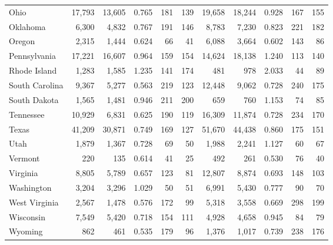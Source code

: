 \documentclass[
]{article}
\begin{document}
\begin{table}
\begin{tabular}[t]{lrrrrrrrrrr}
\addlinespace
Ohio & 17,793 & 13,605 & 0.765 & 181 & 139 & 19,658 & 18,244 & 0.928 & 167 & 155\\
Oklahoma & 6,300 & 4,832 & 0.767 & 191 & 146 & 8,783 & 7,230 & 0.823 & 221 & 182\\
Oregon & 2,315 & 1,444 & 0.624 & 66 & 41 & 6,088 & 3,664 & 0.602 & 143 & 86\\
Pennsylvania & 17,221 & 16,607 & 0.964 & 159 & 154 & 14,624 & 18,138 & 1.240 & 113 & 140\\
Rhode Island & 1,283 & 1,585 & 1.235 & 141 & 174 & 481 & 978 & 2.033 & 44 & 89\\
\addlinespace
South Carolina & 9,367 & 5,277 & 0.563 & 219 & 123 & 12,448 & 9,062 & 0.728 & 240 & 175\\
South Dakota & 1,565 & 1,481 & 0.946 & 211 & 200 & 659 & 760 & 1.153 & 74 & 85\\
Tennessee & 10,929 & 6,831 & 0.625 & 190 & 119 & 16,309 & 11,874 & 0.728 & 234 & 170\\
Texas & 41,209 & 30,871 & 0.749 & 169 & 127 & 51,670 & 44,438 & 0.860 & 175 & 151\\
Utah & 1,879 & 1,367 & 0.728 & 69 & 50 & 1,988 & 2,241 & 1.127 & 60 & 67\\
\addlinespace
Vermont & 220 & 135 & 0.614 & 41 & 25 & 492 & 261 & 0.530 & 76 & 40\\
Virginia & 8,805 & 5,789 & 0.657 & 123 & 81 & 12,807 & 8,874 & 0.693 & 148 & 103\\
Washington & 3,204 & 3,296 & 1.029 & 50 & 51 & 6,991 & 5,430 & 0.777 & 90 & 70\\
West Virginia & 2,567 & 1,478 & 0.576 & 172 & 99 & 5,318 & 3,558 & 0.669 & 298 & 199\\
Wisconsin & 7,549 & 5,420 & 0.718 & 154 & 111 & 4,928 & 4,658 & 0.945 & 84 & 79\\
\addlinespace
Wyoming & 862 & 461 & 0.535 & 179 & 96 & 1,376 & 1,017 & 0.739 & 238 & 176\\
\bottomrule
\end{tabular}
\end{table}
\end{document}
